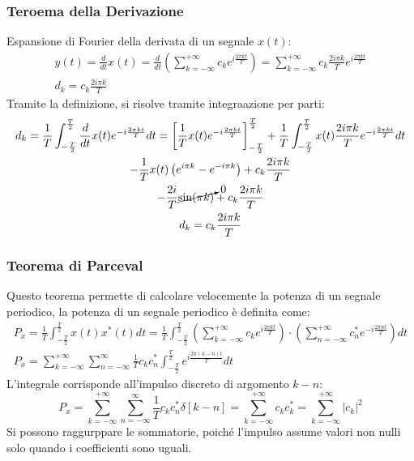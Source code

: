 \documentclass{article}
\numberwithin{equation}{subsection}
\begin{document}
\subsubsection{Teroema della Derivazione}

Espansione di Fourier della derivata di un segnale $x(t)$:
\begin{gather*}
    y(t)=\displaystyle\frac{d}{dt}x(t)=\frac{d}{dt}\left(\displaystyle\sum_{k=-\infty}^{+\infty}c_ke^{i\frac{2\pi kt}{T}}\right)=\sum_{k=-\infty}^{+\infty}c_k\frac{2i\pi k}{T}e^{i\frac{2\pi kt}{T}}\\
    d_k=c_k\displaystyle\frac{2i\pi k}{T}
\end{gather*}
Tramite la definizione, si risolve tramite integraazione per parti:
\begin{gather*}
    d_k=\displaystyle\frac{1}{T}\int_{-\frac{T}{2}}^{\frac{T}{2}}\frac{d}{dt}x(t)e^{-i\frac{2\pi kt}{T}}dt=
    \left[\frac{1}{T}x(t)e^{-i\frac{2\pi kt}{T}}\right]_{-\frac{T}{2}}^{\frac{T}{2}}+\frac{1}{T}\int_{-\frac{T}{2}}^{\frac{T}{2}}x(t)\frac{2i\pi k}{T}e^{-i\frac{2\pi kt}{T}}dt\\
    \displaystyle-\frac{1}{T}x(t)\left(e^{i\pi k}-e^{-i\pi k}\right)+c_k\frac{2i\pi k}{T}\\
    \displaystyle-\frac{2i}{T}\cancelto{0}{\sin(\pi k)}+c_k\frac{2i\pi k}{T}\\
    d_k=c_k\displaystyle\frac{2i\pi k}{T}
\end{gather*}

\subsubsection{Teorema di Parceval}

Questo teorema permette di calcolare velocemente la potenza di un segnale periodico, la potenza di un segnale periodico è definita come:
\begin{gather*}
    P_x=\displaystyle\frac{1}{T}\int_{-\frac{T}{2}}^{\frac{T}{2}}x(t)x^*(t)dt=
    \frac{1}{T}\int_{-\frac{T}{2}}^{\frac{T}{2}}\left(\sum_{k=-\infty}^{+\infty}c_ke^{i\frac{2\pi kt}{T}}\right)\cdot\left(
    \sum_{n=-\infty}^{+\infty}c_n^*e^{-i\frac{2\pi nt}{T}}\right)dt\\
    P_x=\displaystyle\sum_{k=-\infty}^{+\infty}\sum_{n=-\infty}^{\infty}\frac{1}{T}c_kc^*_n\int_{-\frac{T}{2}}^{\frac{T}{2}}e^{i\frac{2\pi (k-n)t}{T}}dt
\end{gather*}
L'integrale corrisponde all'impulso discreto di argomento $k-n$:
\begin{equation*}
    P_x=\displaystyle\sum_{k=-\infty}^{+\infty}\sum_{n=-\infty}^{\infty}\frac{1}{T}c_kc_n^*\delta[k-n]=\sum_{k=-\infty}^{+\infty}c_kc_k^*=\sum_{k=-\infty}^{+\infty}|c_k|^2
\end{equation*}
Si possono raggurppare le sommatorie, poiché l'impulso assume valori non nulli solo quando i coefficienti sono uguali. 
\end{document}
